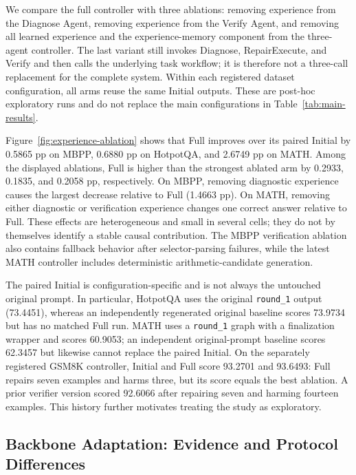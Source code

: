 We compare the full controller with three ablations: removing experience from the Diagnose Agent, removing experience from the Verify Agent, and removing all learned experience and the experience-memory component from the three-agent controller. The last variant still invokes Diagnose, RepairExecute, and Verify and then calls the underlying task workflow; it is therefore not a three-call replacement for the complete system. Within each registered dataset configuration, all arms reuse the same Initial outputs. These are post-hoc exploratory runs and do not replace the main configurations in Table~\ref{tab:main-results}.



Figure~\ref{fig:experience-ablation} shows that Full improves over its paired Initial by 0.5865 pp on MBPP, 0.6880 pp on HotpotQA, and 2.6749 pp on MATH. Among the displayed ablations, Full is higher than the strongest ablated arm by 0.2933, 0.1835, and 0.2058 pp, respectively. On MBPP, removing diagnostic experience causes the largest decrease relative to Full (1.4663 pp). On MATH, removing either diagnostic or verification experience changes one correct answer relative to Full. These effects are heterogeneous and small in several cells; they do not by themselves identify a stable causal contribution. The MBPP verification ablation also contains fallback behavior after selector-parsing failures, while the latest MATH controller includes deterministic arithmetic-candidate generation.

The paired Initial is configuration-specific and is not always the untouched original prompt. In particular, HotpotQA uses the original \texttt{round\_1} output (73.4451), whereas an independently regenerated original baseline scores 73.9734 but has no matched Full run. MATH uses a \texttt{round\_1} graph with a finalization wrapper and scores 60.9053; an independent original-prompt baseline scores 62.3457 but likewise cannot replace the paired Initial. On the separately registered GSM8K controller, Initial and Full score 93.2701 and 93.6493: Full repairs seven examples and harms three, but its score equals the best ablation. A prior verifier version scored 92.6066 after repairing seven and harming fourteen examples. This history further motivates treating the study as exploratory.

\subsection{Backbone Adaptation: Evidence and Protocol Differences}
\label{app:backbone-protocols}

